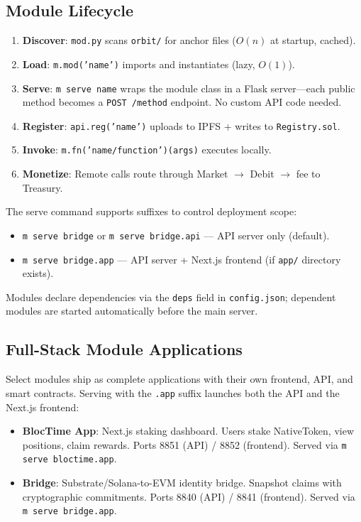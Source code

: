 \documentclass[11pt,a4paper]{article}
\begin{document}
\subsection{Module Lifecycle}

\begin{enumerate}
    \item \textbf{Discover}: \texttt{mod.py} scans \texttt{orbit/} for anchor files ($O(n)$ at startup, cached).
    \item \textbf{Load}: \texttt{m.mod('name')} imports and instantiates (lazy, $O(1)$).
    \item \textbf{Serve}: \texttt{m serve name} wraps the module class in a Flask server---each public method becomes a \texttt{POST /method} endpoint. No custom API code needed.
    \item \textbf{Register}: \texttt{api.reg('name')} uploads to IPFS + writes to \texttt{Registry.sol}.
    \item \textbf{Invoke}: \texttt{m.fn('name/function')(args)} executes locally.
    \item \textbf{Monetize}: Remote calls route through Market $\to$ Debit $\to$ fee to Treasury.
\end{enumerate}

The serve command supports suffixes to control deployment scope:

\begin{itemize}
    \item \texttt{m serve bridge} or \texttt{m serve bridge.api} --- API server only (default).
    \item \texttt{m serve bridge.app} --- API server + Next.js frontend (if \texttt{app/} directory exists).
\end{itemize}

Modules declare dependencies via the \texttt{deps} field in \texttt{config.json}; dependent modules are started automatically before the main server.

\subsection{Full-Stack Module Applications}

Select modules ship as complete applications with their own frontend, API, and smart contracts. Serving with the \texttt{.app} suffix launches both the API and the Next.js frontend:

\begin{itemize}
    \item \textbf{BlocTime App}: Next.js staking dashboard. Users stake NativeToken, view positions, claim rewards. Ports 8851 (API) / 8852 (frontend). Served via \texttt{m serve bloctime.app}.
    \item \textbf{Bridge}: Substrate/Solana-to-EVM identity bridge. Snapshot claims with cryptographic commitments. Ports 8840 (API) / 8841 (frontend). Served via \texttt{m serve bridge.app}.
\end{itemize}
\end{document}
